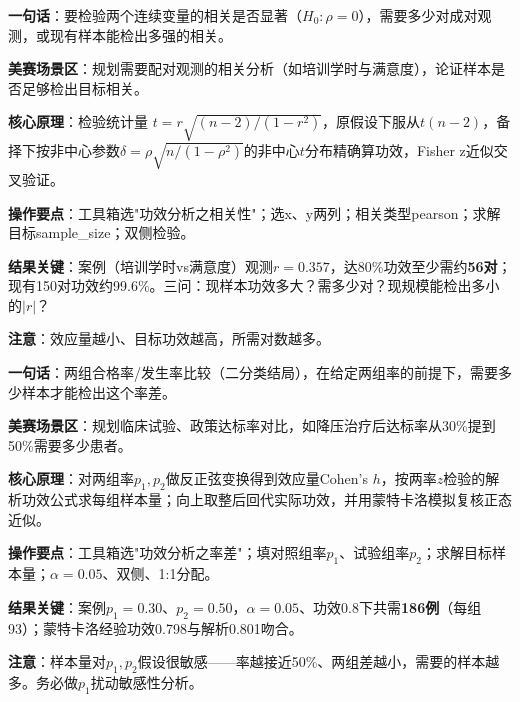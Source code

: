 
\begin{algobrief}
\textbf{一句话}：要检验两个连续变量的相关是否显著（$H_0:\rho=0$），需要多少对成对观测，或现有样本能检出多强的相关。

\textbf{美赛场景区}：规划需要配对观测的相关分析（如培训学时与满意度），论证样本是否足够检出目标相关。

\textbf{核心原理}：检验统计量 $t=r\sqrt{(n-2)/(1-r^2)}$，原假设下服从$t(n-2)$，备择下按非中心参数$\delta=\rho\sqrt{n/(1-\rho^2)}$的非中心$t$分布精确算功效，Fisher z近似交叉验证。

\textbf{操作要点}：工具箱选"功效分析之相关性"；选x、y两列；相关类型pearson；求解目标sample\_size；双侧检验。

\textbf{结果关键}：案例（培训学时vs满意度）观测$r=0.357$，达80\%功效至少需约\textbf{56对}；现有150对功效约99.6\%。三问：现样本功效多大？需多少对？现规模能检出多小的$|r|$？

\textbf{注意}：效应量越小、目标功效越高，所需对数越多。
\end{algobrief}


\begin{algobrief}
\textbf{一句话}：两组合格率/发生率比较（二分类结局），在给定两组率的前提下，需要多少样本才能检出这个率差。

\textbf{美赛场景区}：规划临床试验、政策达标率对比，如降压治疗后达标率从30\%提到50\%需要多少患者。

\textbf{核心原理}：对两组率$p_1,p_2$做反正弦变换得到效应量Cohen's $h$，按两率$z$检验的解析功效公式求每组样本量；向上取整后回代实际功效，并用蒙特卡洛模拟复核正态近似。

\textbf{操作要点}：工具箱选"功效分析之率差"；填对照组率$p_1$、试验组率$p_2$；求解目标样本量；$\alpha=0.05$、双侧、1:1分配。

\textbf{结果关键}：案例$p_1=0.30$、$p_2=0.50$，$\alpha=0.05$、功效0.8下共需\textbf{186例}（每组93）；蒙特卡洛经验功效0.798与解析0.801吻合。

\textbf{注意}：样本量对$p_1,p_2$假设很敏感——率越接近50\%、两组差越小，需要的样本越多。务必做$p_1$扰动敏感性分析。
\end{algobrief}


